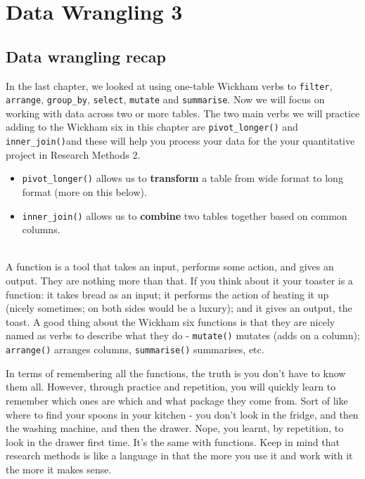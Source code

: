 \documentclass[]{book}
\providecommand{\tightlist}{%
  \setlength{\itemsep}{0pt}\setlength{\parskip}{0pt}}
\newenvironment{try}
    {
    \hline\\
    }
    { 
    \\\\\hline
    }
\begin{document}
\hypertarget{data-wrangling-3}{%
\chapter{Data Wrangling 3}\label{data-wrangling-3}}

\hypertarget{data-wrangling-recap}{%
\section{Data wrangling recap}\label{data-wrangling-recap}}

In the last chapter, we looked at using one-table Wickham verbs to \texttt{filter}, \texttt{arrange}, \texttt{group\_by}, \texttt{select}, \texttt{mutate} and \texttt{summarise}. Now we will focus on working with data across two or more tables. The two main verbs we will practice adding to the Wickham six in this chapter are \texttt{pivot\_longer()} and \texttt{inner\_join()}and these will help you process your data for the your quantitative project in Research Methods 2.

\begin{itemize}
\tightlist
\item
  \texttt{pivot\_longer()} allows us to \textbf{transform} a table from wide format to long format (more on this below).
\item
  \texttt{inner\_join()} allows us to \textbf{combine} two tables together based on common columns.
\end{itemize}

\begin{try}
A function is a tool that takes an input, performs some action, and
gives an output. They are nothing more than that. If you think about it
your toaster is a function: it takes bread as an input; it performs the
action of heating it up (nicely sometimes; on both sides would be a
luxury); and it gives an output, the toast. A good thing about the
Wickham six functions is that they are nicely named as verbs to describe
what they do - \texttt{mutate()} mutates (adds on a column);
\texttt{arrange()} arranges columns, \texttt{summarise()} summarises,
etc.

In terms of remembering all the functions, the truth is you don't have
to know them all. However, through practice and repetition, you will
quickly learn to remember which ones are which and what package they
come from. Sort of like where to find your spoons in your kitchen - you
don't look in the fridge, and then the washing machine, and then the
drawer. Nope, you learnt, by repetition, to look in the drawer first
time. It's the same with functions. Keep in mind that research methods
is like a language in that the more you use it and work with it the more
it makes sense.
\end{try}
\end{document}
